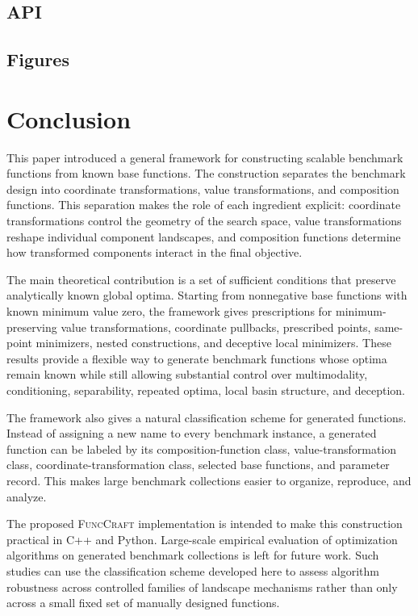 \documentclass[11pt,a4paper]{article}
\theoremstyle{remark}
\theoremstyle{plain}
\begin{document}
\subsection{API}
\subsection{Figures}


\section{Conclusion}

This paper introduced a general framework for constructing scalable benchmark
functions from known base functions. The construction separates the benchmark
design into coordinate transformations, value transformations, and composition
functions. This separation makes the role of each ingredient explicit:
coordinate transformations control the geometry of the search space, value
transformations reshape individual component landscapes, and composition
functions determine how transformed components interact in the final objective.

The main theoretical contribution is a set of sufficient conditions that
preserve analytically known global optima. Starting from nonnegative base
functions with known minimum value zero, the framework gives prescriptions for
minimum-preserving value transformations, coordinate pullbacks, prescribed
points, same-point minimizers, nested constructions, and deceptive local
minimizers. These results provide a flexible way to generate benchmark
functions whose optima remain known while still allowing substantial control
over multimodality, conditioning, separability, repeated optima, local basin
structure, and deception.

The framework also gives a natural classification scheme for generated
functions. Instead of assigning a new name to every benchmark instance, a
generated function can be labeled by its composition-function class,
value-transformation class, coordinate-transformation class, selected base
functions, and parameter record. This makes large benchmark collections easier
to organize, reproduce, and analyze.

The proposed \textsc{FuncCraft} implementation is intended to make this
construction practical in C++ and Python. Large-scale empirical evaluation of
optimization algorithms on generated benchmark collections is left for future
work. Such studies can use the classification scheme developed here to assess
algorithm robustness across controlled families of landscape mechanisms rather
than only across a small fixed set of manually designed functions.

















\appendix
\end{document}
